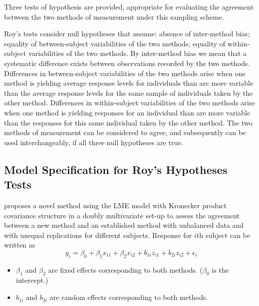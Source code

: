 \documentclass[12pt, a4paper]{report}
\theoremstyle{plain}
\theoremstyle{definition}
\theoremstyle{remark}
\begin{document}
	
	Three tests of hypothesis are provided, appropriate for evaluating the agreement between the two methods of measurement under this sampling scheme. 
	
	Roy's tests consider null hypotheses that assume: absence of inter-method bias; equality of between-subject variabilities of the two methods; equality of within-subject variabilities of the two methods. By inter-method bias we mean that a systematic difference exists between observations recorded by the two methods. Differences in between-subject variabilities of the two methods arise when one method is yielding average response levels for individuals than are more variable than the average response levels for the same sample of individuals taken by the other method.  Differences in within-subject variabilities of the two methods arise when one method is yielding responses for an individual than are more variable than the responses for this same individual taken by the other method. The two methods of measurement can be considered to agree, and subsequently can be used interchangeably, if all three null hypotheses are true.
	
	
	
	
	
	\subsection{Model Specification for Roy's Hypotheses Tests}
	
	\citet{ARoy2009} proposes a novel method using the LME model with Kronecker product covariance structure in a doubly multivariate set-up to assess the agreement between a new method and an established method with unbalanced data and with unequal replications for different subjects.
	Response for $i$th subject can be written as
	\[ y_i = \beta_0 + \beta_1x_{i1} + \beta_2x_{i2} + b_{1i}z_{i1}  + b_{2i}z_{i2} + \epsilon_i \]
	\begin{itemize}
		\item $\beta_1$ and $\beta_2$ are fixed effects corresponding to both methods. ($\beta_0$ is the intercept.)
		\item $b_{1i}$ and $b_{2i}$ are random effects corresponding to both methods.
	\end{itemize}
	
	
	
	
	
	
\end{document}
